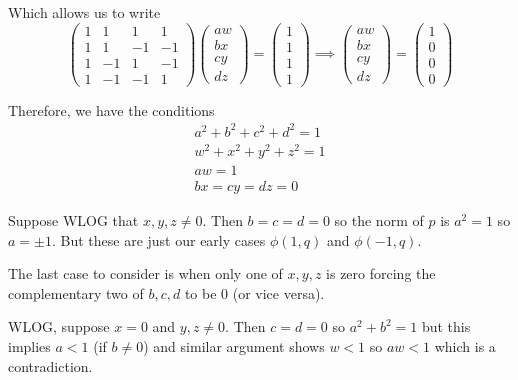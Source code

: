 \documentclass[12pt]{article}
\begin{document}
        Which allows us to write 
        \[\begin{pmatrix}
            1 & 1 & 1 & 1\\
            1 & 1 & -1 & -1\\
            1 & -1 & 1 & -1\\
            1 & -1 & -1 & 1
        \end{pmatrix} \begin{pmatrix}
            aw\\bx\\ cy\\ dz
        \end{pmatrix} = \begin{pmatrix}
            1\\1\\1\\1
        \end{pmatrix} \implies \begin{pmatrix}
            aw\\bx\\cy\\dz
        \end{pmatrix} = \begin{pmatrix}
            1\\0\\0\\0
        \end{pmatrix}\]

        Therefore, we have the conditions 
        \begin{gather*}
            a^2 + b^2 + c^2 + d^2 = 1\\ 
            w^2 + x^2 + y^2 + z^2 = 1\\ 
            aw = 1\\ 
            bx = cy = dz = 0
        \end{gather*}

        Suppose WLOG that $x, y, z \neq 0$. Then $b = c = d = 0$ so the norm of $p$ is $a^2 = 1$ so $a = \pm 1$. But these are just our early cases $\phi(1, q)$ and $\phi(-1, q)$.
        
        The last case to consider is when only one of $x, y, z$ is zero forcing the complementary two of $b, c, d$ to be $0$ (or vice versa).
        
        WLOG, suppose $x = 0$ and $y, z \neq 0$. Then $c = d = 0$ so $a^2 + b^2 = 1$ but this implies $a < 1$ (if $b \neq 0$) and similar argument shows $w < 1$ so $aw < 1$ which is a contradiction.
\end{document}
